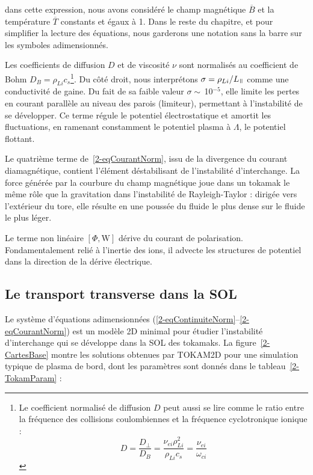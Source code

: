 \begin{refsection}
dans cette expression, nous avons considéré le champ magnétique $\overbar{B}$ et
la température $\overbar{T}$ constants et égaux à 1. Dans le reste du chapitre,
et pour simplifier la lecture des équations, nous garderons une notation sans la
barre sur les symboles adimensionnés.

Les
coefficients de diffusion $D$ et de viscosité $\nu$ sont normalisés au coefficient de Bohm $D_B=\rho_{Li}c_s$\footnote{Le coefficient normalisé de
diffusion $D$ peut aussi se lire comme le ratio entre la fréquence des
collisions coulombiennes et la fréquence cyclotronique ionique :
$$D=\frac{D_\perp}{D_B}=\frac{\nu_{ei}\rho_{Li}^2}{\rho_{Li}c_s}=\frac{\nu_{ei}}{\omega_{ci}}$$
}.
Du côté droit, nous interprétons $\sigma=\rho_{Li}/L_\para$ comme une
conductivité de gaine. Du fait de sa faible valeur $\sigma\sim\,$10$^{-5}$, elle
limite les pertes en courant parallèle au niveau des parois (limiteur),
permettant à l'instabilité de se développer. Ce terme régule le potentiel
électrostatique et amortit les fluctuations, en ramenant constamment le
potentiel plasma à $\Lambda$, le potentiel flottant.

Le quatrième terme de~\eqref{2-eqCourantNorm}, issu de la divergence
du courant diamagnétique, contient l'élément déstabilisant de
 l'instabilité d'interchange. La force générée par la courbure du champ
 magnétique joue dans un tokamak le même rôle que la gravitation dans
 l'instabilité de Rayleigh-Taylor : dirigée vers l'extérieur du tore, elle 
 résulte en une poussée du fluide le plus dense sur le fluide le plus léger. 
 
 Le terme non linéaire $[\Phi,\text{W}]$ dérive du courant de polarisation.
 Fondamentalement relié à l'inertie des ions, il advecte les structures de
 potentiel dans la direction de la dérive électrique.
 

\subsection{Le transport transverse dans la SOL}

Le système d'équations
adimensionnées (\eqref{2-eqContinuiteNorm}--\eqref{2-eqCourantNorm}) est un
modèle 2D minimal pour étudier l'instabilité d'interchange qui se développe dans
la SOL des tokamaks. La figure~\ref{2-CartesBase} montre les solutions obtenues
par TOKAM2D pour une simulation typique de plasma de bord, dont les paramètres
sont donnés dans le tableau~\ref{2-TokamParam} :


\end{refsection}
